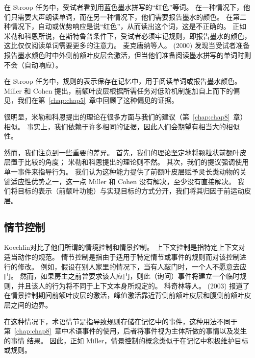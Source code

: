 在 Stroop 任务中，受试者看到用蓝色墨水拼写的“红色”等词。
在一种情况下，他们只需要大声朗读单词，而在另一种情况下，他们需要报告墨水的颜色。
在第二种情况下，自动或优势响应是说“红色”，从而读出这个词，这是不正确的。
正如米勒和科恩所说，在斯特鲁普条件下，受试者必须牢记规则，即报告墨水的颜色，这比仅仅阅读单词需要更多的注意力。
麦克唐纳等人。 (2000) 发现当受试者准备报告墨水颜色时中外侧前额叶皮层会激活，但当他们准备阅读墨水拼写的单词时则不会（自动响应）。
\par


在 Stroop 任务中，规则的表示保存在记忆中，用于阅读单词或报告墨水颜色。
Miller 和 Cohen 提出，前额叶皮层根据所需任务对低阶机制施加自上而下的偏见，我们在第~\ref{chap:chap5}~章中回顾了这种偏见的证据。
\par


很明显，米勒和科恩\cite{miller2001integrative}提出的理论在很多方面与我们的建议（第~\ref{chap:chap8}~章）相似。
事实上，我们依赖于许多相同的证据，因此人们会期望有相当大的相似性。
\par


然而，我们注意到一些重要的差异。
首先，我们的理论坚定地将颗粒状前额叶皮层置于比较的角度；
米勒和科恩提出的理论则不然。
其次，我们的提议强调使用单一事件来指导行为。
我们认为这种能力提供了前额叶皮层赋予灵长类动物的关键适应性优势之一，这一点 Miller 和 Cohen 没有解决，至少没有直接解决。
我们将目标的表示（前额叶功能）与实现目标的方式分开，我们将其归因于前运动皮层。



\subsection{情节控制}

Koechlin\cite{koechlin2007information}对比了他们所谓的情境控制和情景控制。
上下文控制是指特定上下文对适当动作的规范。
情节控制是指由于适用于特定情节或事件的规则而对该控制进行的修改。
例如，假设在别人家里的情况下，当有人敲门时，一个人不愿意去应门。
然而，如果房主之前曾要求该人应门，则此（询问）事件将建立一个临时规则，并且该人的行为将不同于上下文本身所规定的。
科奇林等人。 (2003) 报道了在情景控制期间前额叶皮层的激活，峰值激活靠近背侧前额叶皮层和腹侧前额叶皮层之间的边界。
\par


在这种情况下，术语情节是指导致规则存储在记忆中的事件，这种用法不同于第~\ref{chap:chap8}~章中术语事件的使用，后者将事件视为主体所做的事情以及发生的事情 结果。
因此，正如 Miller\cite{miller2001integrative}，情景控制的概念类似于在记忆中积极维护目标或规则。
\par


